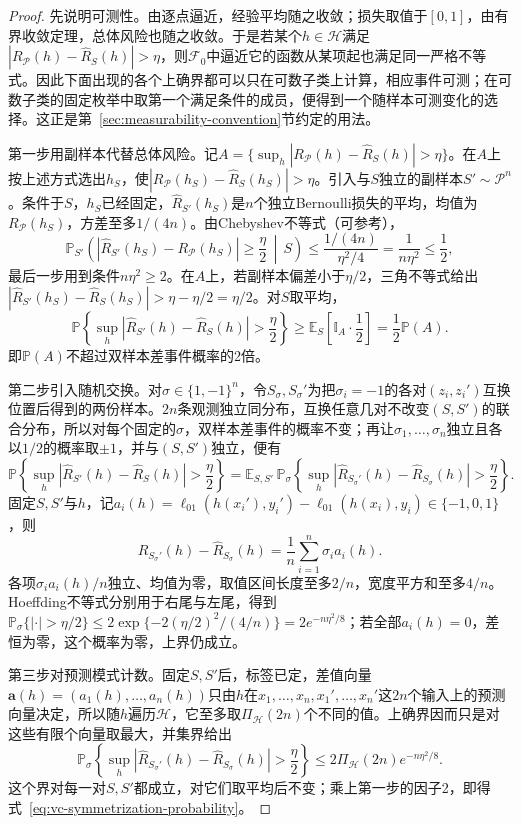 \begin{proof}
先说明可测性。由逐点逼近，经验平均随之收敛；损失取值于$[0,1]$，由有界收敛定理，总体风险也随之收敛。于是若某个$h\in\mathcal H$满足$|R_{\mathcal P}(h)-\hat R_S(h)|>\eta$，则$\mathcal F_0$中逼近它的函数从某项起也满足同一严格不等式。因此下面出现的各个上确界都可以只在可数子类上计算，相应事件可测；在可数子类的固定枚举中取第一个满足条件的成员，便得到一个随样本可测变化的选择。这正是第~\ref{sec:measurability-convention}节约定的用法。

第一步用副样本代替总体风险。记$A=\{\sup_h|R_{\mathcal P}(h)-\hat R_S(h)|>\eta\}$。在$A$上按上述方式选出$h_S$，使$|R_{\mathcal P}(h_S)-\hat R_S(h_S)|>\eta$。引入与$S$独立的副样本$S'\sim\mathcal P^n$。条件于$S$，$h_S$已经固定，$\hat R_{S'}(h_S)$是$n$个独立Bernoulli损失的平均，均值为$R_{\mathcal P}(h_S)$，方差至多$1/(4n)$。由Chebyshev不等式（可参考），
\[
 \mathbb P_{S'}\left(
   |\hat R_{S'}(h_S)-R_{\mathcal P}(h_S)|\geq\frac{\eta}{2}
   \,\middle|\,S
 \right)
 \leq\frac{1/(4n)}{\eta^2/4}=\frac{1}{n\eta^2}\leq\frac12,
\]
最后一步用到条件$n\eta^2\geq2$。在$A$上，若副样本偏差小于$\eta/2$，三角不等式给出$|\hat R_{S'}(h_S)-\hat R_S(h_S)|>\eta-\eta/2=\eta/2$。对$S$取平均，
\[
 \mathbb P\left\{\sup_h|\hat R_{S'}(h)-\hat R_S(h)|>\frac\eta2\right\}
 \geq\mathbb E_S\left[\mathbb I_A\cdot\frac12\right]
 =\frac12\mathbb P(A).
\]
即$\mathbb P(A)$不超过双样本差事件概率的2倍。

第二步引入随机交换。对$\sigma\in\{1,-1\}^n$，令$S_\sigma,S_\sigma'$为把$\sigma_i=-1$的各对$(z_i,z_i')$互换位置后得到的两份样本。$2n$条观测独立同分布，互换任意几对不改变$(S,S')$的联合分布，所以对每个固定的$\sigma$，双样本差事件的概率不变；再让$\sigma_1,\ldots,\sigma_n$独立且各以$1/2$的概率取$\pm1$，并与$(S,S')$独立，便有
\[
 \mathbb P\left\{\sup_h|\hat R_{S'}(h)-\hat R_S(h)|>\frac\eta2\right\}
 =\mathbb E_{S,S'}\,\mathbb P_\sigma\left\{\sup_h|\hat R_{S_\sigma'}(h)-\hat R_{S_\sigma}(h)|>\frac\eta2\right\}.
\]
固定$S,S'$与$h$，记$a_i(h)=\ell_{01}(h(x_i'),y_i')-\ell_{01}(h(x_i),y_i)\in\{-1,0,1\}$，则
\[
 \hat R_{S_\sigma'}(h)-\hat R_{S_\sigma}(h)
 =\frac1n\sum_{i=1}^n\sigma_i a_i(h).
\]
各项$\sigma_ia_i(h)/n$独立、均值为零，取值区间长度至多$2/n$，宽度平方和至多$4/n$。Hoeffding不等式分别用于右尾与左尾，得到$\mathbb P_\sigma\{|\cdot|>\eta/2\}\leq2\exp\{-2(\eta/2)^2/(4/n)\}=2e^{-n\eta^2/8}$；若全部$a_i(h)=0$，差恒为零，这个概率为零，上界仍成立。

第三步对预测模式计数。固定$S,S'$后，标签已定，差值向量$\bm a(h)=(a_1(h),\ldots,a_n(h))$只由$h$在$x_1,\ldots,x_n,x_1',\ldots,x_n'$这$2n$个输入上的预测向量决定，所以随$h$遍历$\mathcal H$，它至多取$\Pi_{\mathcal H}(2n)$个不同的值。上确界因而只是对这些有限个向量取最大，并集界给出
\[
 \mathbb P_\sigma\left\{
   \sup_h|\hat R_{S_\sigma'}(h)-\hat R_{S_\sigma}(h)|>\frac\eta2
 \right\}
 \leq2\Pi_{\mathcal H}(2n)e^{-n\eta^2/8}.
\]
这个界对每一对$S,S'$都成立，对它们取平均后不变；乘上第一步的因子2，即得式~\eqref{eq:vc-symmetrization-probability}。


\end{proof}
